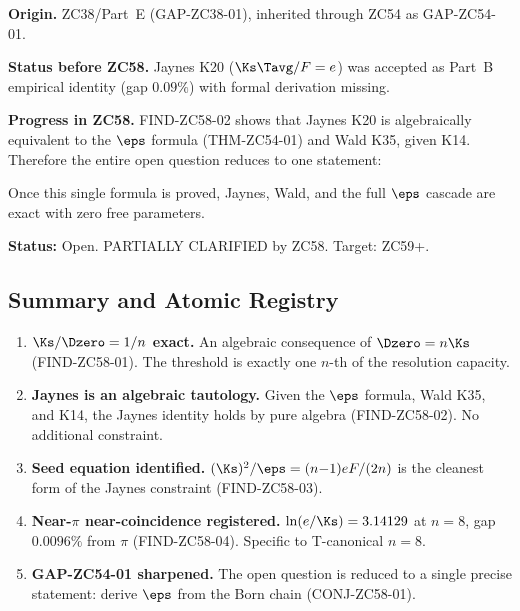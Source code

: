 \documentclass[12pt, a4paper]{article}
\begin{document}
\begin{openqbox}[title={GAP-ZC54-01: Jaynes K20 from Axioms
  --- Reduced to Single Precise Statement}]
\textbf{Origin.} ZC38/Part~E (GAP-ZC38-01), inherited through
ZC54 as GAP-ZC54-01.

\textbf{Status before ZC58.}
Jaynes K20 ($\Ks\Tavg/F=e$) was accepted as Part~B empirical
identity (gap $0.09\%$) with formal derivation missing.

\textbf{Progress in ZC58.}
FIND-ZC58-02 shows that Jaynes K20 is algebraically equivalent
to the $\eps$ formula (THM-ZC54-01) and Wald K35, given K14.
Therefore the entire open question reduces to one statement:

\medskip
\begin{center}
\end{center}

\medskip
Once this single formula is proved, Jaynes, Wald, and the
full $\eps$ cascade are exact with zero free parameters.

\textbf{Status:} Open.  PARTIALLY CLARIFIED by ZC58.
Target: ZC59+.
\end{openqbox}

\subsection{Summary and Atomic Registry}

\begin{enumerate}[leftmargin=2em]

\item \textbf{$\Ks/\Dzero=1/n$ exact.}
  An algebraic consequence of $\Dzero=n\Ks$
  (FIND-ZC58-01).  The threshold is exactly
  one $n$-th of the resolution capacity.

\item \textbf{Jaynes is an algebraic tautology.}
  Given the $\eps$ formula, Wald K35, and K14,
  the Jaynes identity holds by pure algebra
  (FIND-ZC58-02).  No additional constraint.

\item \textbf{Seed equation identified.}
  $(\Ks)^2/\eps=(n{-}1)eF/(2n)$ is the cleanest form
  of the Jaynes constraint (FIND-ZC58-03).

\item \textbf{Near-$\pi$ near-coincidence registered.}
  $\ln(e/\Ks)=3.14129$ at $n=8$, gap $0.0096\%$ from $\pi$
  (FIND-ZC58-04).  Specific to T-canonical $n=8$.

\item \textbf{GAP-ZC54-01 sharpened.}
  The open question is reduced to a single precise statement:
  derive $\eps$ from the Born chain (CONJ-ZC58-01).

\end{enumerate}
\end{document}
